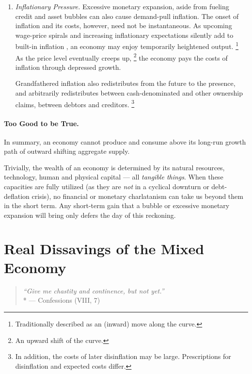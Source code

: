 \begin{enumerate}
	\item \emph{Inflationary Pressure.}
		\label{itm:inflationary-pressure}
	Excessive monetary expansion, aside from fueling credit and asset bubbles can also cause demand-pull inflation.
	The onset of inflation and its costs, however, need not be instantaneous.
	As upcoming wage-price spirals and increasing inflationary expectations silently add to built-in inflation \citep{Gordon1988}, an economy may enjoy temporarily  heightened output.
	\footnote{
		Traditionally described as an (inward) move along the \cite{Phillips1958} curve.
	}
	As the price level eventually creeps up,
	\footnote{
		An upward shift of the \cite{Phillips1958} curve.
	}
	the economy pays the costs of inflation through depressed growth.

	Grandfathered inflation also redistributes from the future to the presence, and arbitrarily redistributes between cash-denominated and other ownership claims, between debtors and creditors.
	\footnote{
		In addition, the costs of later disinflation may be large.
		Prescriptions for disinflation and expected costs differ.
	}
\end{enumerate}

\paragraph[Too Good To Be True]{Too Good to be True.}
In summary, an economy cannot produce and consume above its long-run growth path of outward shifting aggregate supply.

Trivially, the wealth of an economy is determined by its natural resources, technology, human and physical capital --- all \emph{tangible things}.
When these capacities are fully utilized (as they are \emph{not} in a cyclical downturn or debt-deflation crisis), no financial or monetary charlatanism can take us beyond them in the short term.
Any short-term gain that a bubble or excessive monetary expansion will bring only defers the day of this reckoning.

\section[Real Dissavings]{Real Dissavings of the Mixed Economy}
	\label{sec:real-dissavings}

\begin{quote}
	\emph{``Give me chastity and continence, but not yet.''}
	\\*
	--- \citeauthor{St.AugusteofHippo397} Confessions (VIII, 7)
\end{quote}

